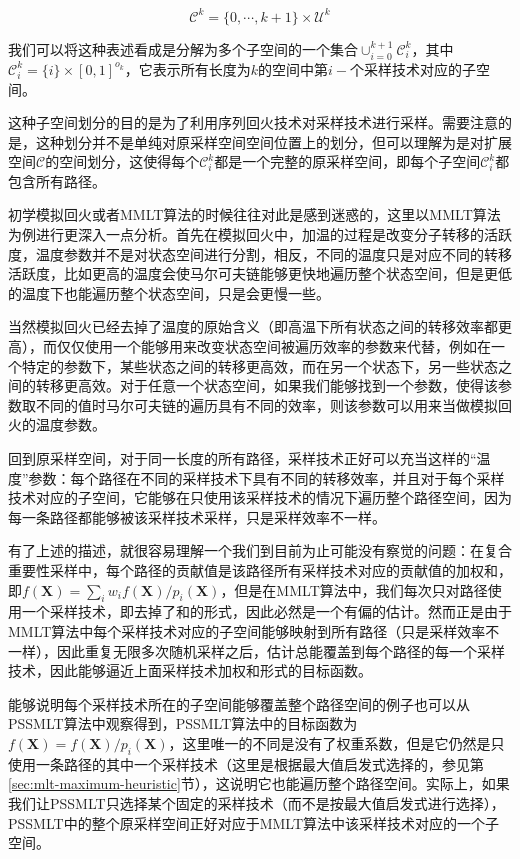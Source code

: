 \begin{equation}
	\mathscr{C}^{k}=\{0,\cdots,k+1\}\times\mathcal{U}^{k}
\end{equation}

\noindent 我们可以将这种表述看成是分解为多个子空间的一个集合$\cup^{k+1}_{i=0}\mathscr{C}^{k}_i$，其中$\mathscr{C}^{k}_i=\{i\}\times [0,1]^{o_k}$，它表示所有长度为$k$的空间中第$i-$个采样技术对应的子空间。

这种子空间划分的目的是为了利用序列回火技术对采样技术进行采样。需要注意的是，这种划分并不是单纯对原采样空间空间位置上的划分，但可以理解为是对扩展空间$\mathscr{C}$的空间划分，这使得每个$\mathscr{C}^{k}_i$都是一个完整的原采样空间，即每个子空间$\mathscr{C}^{k}_i$都包含所有路径。

初学模拟回火或者MMLT算法的时候往往对此是感到迷惑的，这里以MMLT算法为例进行更深入一点分析。首先在模拟回火中，加温的过程是改变分子转移的活跃度，温度参数并不是对状态空间进行分割，相反，不同的温度只是对应不同的转移活跃度，比如更高的温度会使马尔可夫链能够更快地遍历整个状态空间，但是更低的温度下也能遍历整个状态空间，只是会更慢一些。

当然模拟回火已经去掉了温度的原始含义（即高温下所有状态之间的转移效率都更高），而仅仅使用一个能够用来改变状态空间被遍历效率的参数来代替，例如在一个特定的参数下，某些状态之间的转移更高效，而在另一个状态下，另一些状态之间的转移更高效。对于任意一个状态空间，如果我们能够找到一个参数，使得该参数取不同的值时马尔可夫链的遍历具有不同的效率，则该参数可以用来当做模拟回火的温度参数。

回到原采样空间，对于同一长度的所有路径，采样技术正好可以充当这样的“温度”参数：每个路径在不同的采样技术下具有不同的转移效率，并且对于每个采样技术对应的子空间，它能够在只使用该采样技术的情况下遍历整个路径空间，因为每一条路径都能够被该采样技术采样，只是采样效率不一样。

有了上述的描述，就很容易理解一个我们到目前为止可能没有察觉的问题：在复合重要性采样中，每个路径的贡献值是该路径所有采样技术对应的贡献值的加权和，即$f(\mathbf{X})=\sum_i w_i f(\mathbf{X})/p_i(\mathbf{X})$，但是在MMLT算法中，我们每次只对路径使用一个采样技术，即去掉了和的形式，因此必然是一个有偏的估计。然而正是由于MMLT算法中每个采样技术对应的子空间能够映射到所有路径（只是采样效率不一样），因此重复无限多次随机采样之后，估计总能覆盖到每个路径的每一个采样技术，因此能够逼近上面采样技术加权和形式的目标函数。

能够说明每个采样技术所在的子空间能够覆盖整个路径空间的例子也可以从PSSMLT算法中观察得到，PSSMLT算法中的目标函数为$f(\mathbf{X})=f(\mathbf{X})/p_i(\mathbf{X})$，这里唯一的不同是没有了权重系数，但是它仍然是只使用一条路径的其中一个采样技术（这里是根据最大值启发式选择的，参见第\ref{sec:mlt-maximum-heuristic}节），这说明它也能遍历整个路径空间。实际上，如果我们让PSSMLT只选择某个固定的采样技术（而不是按最大值启发式进行选择），PSSMLT中的整个原采样空间正好对应于MMLT算法中该采样技术对应的一个子空间。

